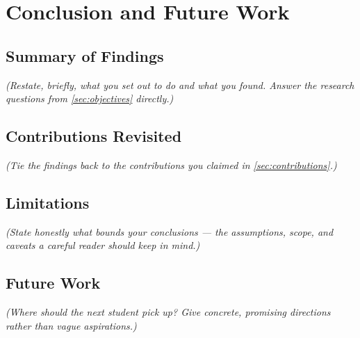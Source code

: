 \chapter{Conclusion and Future Work}
\label{ch:conclusion}

\section{Summary of Findings}
\label{sec:concl-summary}

\emph{(Restate, briefly, what you set out to do and what you found. Answer the
research questions from \cref{sec:objectives} directly.)}

\section{Contributions Revisited}
\label{sec:concl-contributions}

\emph{(Tie the findings back to the contributions you claimed in
\cref{sec:contributions}.)}

\section{Limitations}
\label{sec:concl-limitations}

\emph{(State honestly what bounds your conclusions --- the assumptions, scope,
and caveats a careful reader should keep in mind.)}

\section{Future Work}
\label{sec:concl-future}

\emph{(Where should the next student pick up? Give concrete, promising
directions rather than vague aspirations.)}
